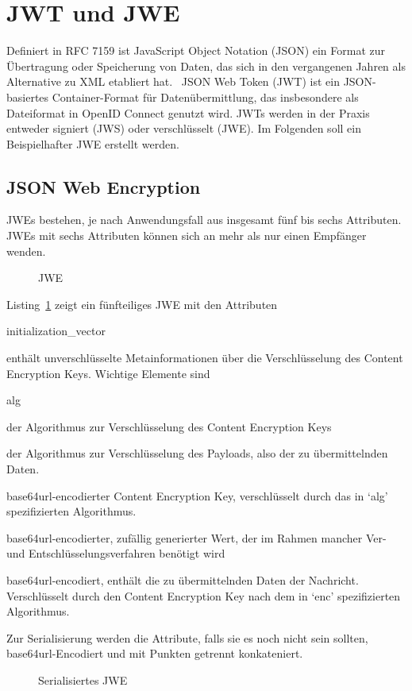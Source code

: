 \section{JWT und JWE}
Definiert in RFC 7159 ist JavaScript Object Notation (JSON) ein Format
zur Übertragung oder Speicherung von Daten, das sich in den vergangenen Jahren
als Alternative zu XML etabliert hat.~
JSON Web Token (JWT) ist ein JSON-basiertes Container-Format für
Datenübermittlung, das insbesondere als Dateiformat in OpenID Connect genutzt
wird. JWTs werden in der Praxis entweder signiert (JWS) oder verschlüsselt
(JWE).
Im Folgenden soll ein Beispielhafter JWE erstellt werden.

\subsection{JSON Web Encryption}
JWEs bestehen, je nach Anwendungsfall aus insgesamt fünf bis sechs
Attributen. JWEs mit sechs Attributen können sich an mehr als nur einen
Empfänger wenden.

\begin{figure}[h]
    \scalebox{.8}{
        
    }
    \caption{JWE}\label{ls: JWE}
\end{figure}
Listing~\ref{ls: JWE} zeigt ein fünfteiliges JWE mit den Attributen

\begin{labeling}{initialization\_vector}
    \item [header] enthält unverschlüsselte Metainformationen über die
    Verschlüsselung des Content Encryption Keys. Wichtige Elemente sind
    \begin{labeling}{alg}
        \item[alg] der Algorithmus zur Verschlüsselung des Content Encryption
        Keys
        \item[enc] der Algorithmus zur Verschlüsselung des Payloads, also der zu
        übermittelnden Daten.
    \end{labeling}
    \item [encrypted\_key] base64url-encodierter Content Encryption Key,
    verschlüsselt durch das in `alg' spezifizierten Algorithmus.
    \item [initialization\_vector] base64url-encodierter, zufällig generierter
    Wert, der im Rahmen mancher Ver- und Entschlüsselungsverfahren benötigt wird
    \item[ciphertext] base64url-encodiert, enthält die zu übermittelnden Daten der
    Nachricht. Verschlüsselt durch den Content Encryption Key nach dem in `enc'
    spezifizierten Algorithmus.
    \item[tag]
\end{labeling}
Zur Serialisierung werden die Attribute, falls sie es noch nicht sein sollten,
base64url-Encodiert und mit Punkten getrennt konkateniert.

\begin{figure}[h]
    \scalebox{.8}{
        
    }
    \caption{Serialisiertes JWE}\label{ls: serializedJWE}
\end{figure}
